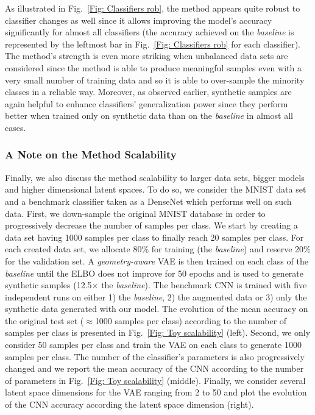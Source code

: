 \documentclass[10pt,journal,compsoc]{IEEEtran}
\begin{document}
As illustrated in Fig.~\ref{Fig: Classifiers rob}, the method appears quite robust to classifier changes as well since it allows improving the model's accuracy significantly for almost all classifiers (the accuracy achieved on the \emph{baseline} is represented by the leftmost bar in Fig.~\ref{Fig: Classifiers rob} for each classifier).  The method's strength is even more striking when unbalanced data sets are considered since the method is able to produce meaningful samples even with a very small number of training data and so it is able to over-sample the minority classes in a reliable way. Moreover, as observed earlier, synthetic samples are again helpful to enhance classifiers' generalization power since they perform better when trained only on synthetic data than on the \emph{baseline} in almost all cases.


\subsubsection{A Note on the Method Scalability}

Finally, we also discuss the method scalability to larger data sets, bigger models and higher dimensional latent spaces. To do so, we consider the MNIST data set and a benchmark classifier taken as a DenseNet which performs well on such data. First, we down-sample the original MNIST database in order to progressively decrease the number of samples per class. We start by creating a data set having 1000 samples per class to finally reach 20 samples per class. For each created data set, we allocate 80\% for training (the \emph{baseline}) and reserve 20\% for the validation set. A \emph{geometry-aware} VAE is then trained on each class of the \emph{baseline} until the ELBO does not improve for 50 epochs and is used to generate synthetic samples (12.5$\times$ the \emph{baseline}). The benchmark CNN is trained with five independent runs on either 1) the \emph{baseline}, 2) the augmented data or 3) only the synthetic data generated with our model. The evolution of the mean accuracy on the original test set ($\approx$1000 samples per class) according to the number of samples per class is presented in Fig.~\ref{Fig: Toy scalability} (left). Second, we only consider 50 samples per class and train the VAE on each class to generate 1000 samples per class. The number of the classifier's parameters is  also progressively changed and we report the mean accuracy of the CNN according to the number of parameters in Fig.~\ref{Fig: Toy scalability} (middle). Finally, we consider several latent space dimensions for the VAE ranging from 2 to 50 and plot the evolution of the CNN accuracy according the latent space dimension (right).
\end{document}
